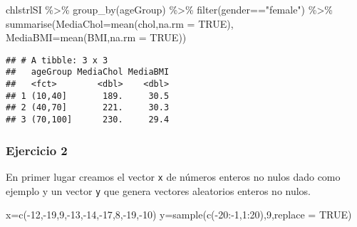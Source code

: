 \documentclass[
]{article}
\newenvironment{Shaded}{\begin{snugshade}}{\end{snugshade}}
\newcommand{\AttributeTok}[1]{\textcolor[rgb]{0.77,0.63,0.00}{#1}}
\newcommand{\ConstantTok}[1]{\textcolor[rgb]{0.00,0.00,0.00}{#1}}
\newcommand{\DecValTok}[1]{\textcolor[rgb]{0.00,0.00,0.81}{#1}}
\newcommand{\FunctionTok}[1]{\textcolor[rgb]{0.00,0.00,0.00}{#1}}
\newcommand{\NormalTok}[1]{#1}
\newcommand{\OtherTok}[1]{\textcolor[rgb]{0.56,0.35,0.01}{#1}}
\newcommand{\SpecialCharTok}[1]{\textcolor[rgb]{0.00,0.00,0.00}{#1}}
\newcommand{\StringTok}[1]{\textcolor[rgb]{0.31,0.60,0.02}{#1}}
\begin{document}
\begin{Shaded}
\begin{Highlighting}[]
\NormalTok{chlstrlSI }\SpecialCharTok{\%\textgreater{}\%} \FunctionTok{group\_by}\NormalTok{(ageGroup) }\SpecialCharTok{\%\textgreater{}\%} \FunctionTok{filter}\NormalTok{(gender}\SpecialCharTok{==}\StringTok{"female"}\NormalTok{)  }\SpecialCharTok{\%\textgreater{}\%}
  \FunctionTok{summarise}\NormalTok{(}\AttributeTok{MediaChol=}\FunctionTok{mean}\NormalTok{(chol,}\AttributeTok{na.rm =} \ConstantTok{TRUE}\NormalTok{), }\AttributeTok{MediaBMI=}\FunctionTok{mean}\NormalTok{(BMI,}\AttributeTok{na.rm =} \ConstantTok{TRUE}\NormalTok{))}
\end{Highlighting}
\end{Shaded}

\begin{verbatim}
## # A tibble: 3 x 3
##   ageGroup MediaChol MediaBMI
##   <fct>        <dbl>    <dbl>
## 1 (10,40]       189.     30.5
## 2 (40,70]       221.     30.3
## 3 (70,100]      230.     29.4
\end{verbatim}

\hypertarget{ejercicio-2}{%
\subsubsection{Ejercicio 2}\label{ejercicio-2}}

En primer lugar creamos el vector \texttt{x} de números enteros no nulos
dado como ejemplo y un vector \texttt{y} que genera vectores aleatorios
enteros no nulos.

\begin{Shaded}
\begin{Highlighting}[]
\NormalTok{x}\OtherTok{=}\FunctionTok{c}\NormalTok{(}\SpecialCharTok{{-}}\DecValTok{12}\NormalTok{,}\SpecialCharTok{{-}}\DecValTok{19}\NormalTok{,}\DecValTok{9}\NormalTok{,}\SpecialCharTok{{-}}\DecValTok{13}\NormalTok{,}\SpecialCharTok{{-}}\DecValTok{14}\NormalTok{,}\SpecialCharTok{{-}}\DecValTok{17}\NormalTok{,}\DecValTok{8}\NormalTok{,}\SpecialCharTok{{-}}\DecValTok{19}\NormalTok{,}\SpecialCharTok{{-}}\DecValTok{10}\NormalTok{)}
\NormalTok{y}\OtherTok{=}\FunctionTok{sample}\NormalTok{(}\FunctionTok{c}\NormalTok{(}\SpecialCharTok{{-}}\DecValTok{20}\SpecialCharTok{:{-}}\DecValTok{1}\NormalTok{,}\DecValTok{1}\SpecialCharTok{:}\DecValTok{20}\NormalTok{),}\DecValTok{9}\NormalTok{,}\AttributeTok{replace =} \ConstantTok{TRUE}\NormalTok{)}
\end{Highlighting}
\end{Shaded}
\end{document}
